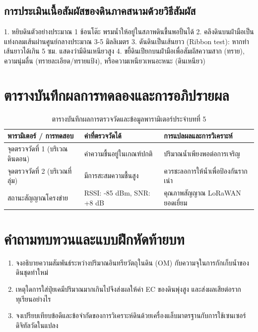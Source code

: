 \subsection{การประเมินเนื้อสัมผัสของดินภาคสนามด้วยวิธีสัมผัส}
\begin{sensorbox}
1. หยิบดินตัวอย่างประมาณ 1 ช้อนโต๊ะ พรมน้ำให้อยู่ในสภาพดินชื้นพอปั้นได้
2. คลึงดินบนฝ่ามือเป็นแท่งกลมเส้นผ่านศูนย์กลางประมาณ 3-5 มิลลิเมตร
3. ดันดินเป็นเส้นยาว (Ribbon test): หากทำเส้นยาวได้เกิน 5 ซม. แสดงว่ามีดินเหนียวสูง
4. ขยี้ดินเปียกบนฝ่ามือเพื่อสัมผัสความสาก (ทราย), ความนุ่มลื่น (ทรายละเอียด/ทรายแป้ง), หรือความเหนียวเหนอะหนะ (ดินเหนียว)
\end{sensorbox}

\section{ตารางบันทึกผลการทดลองและการอภิปรายผล}
\begin{table}[H]
\centering\small
\caption{ตารางบันทึกผลการตรวจวัดและข้อมูลพารามิเตอร์ประจำบทที่ 5}
\label{tab:ch05_datasheet}
\begin{tabularx}{\textwidth}{p{} p{} X}
\toprule
\textbf{พารามิเตอร์ / การทดสอบ} & \textbf{ค่าที่ตรวจวัดได้} & \textbf{การแปลผลและการวิเคราะห์} \\
\midrule
จุดตรวจวัดที่ 1 (บริเวณดินดอน) & ค่าความชื้นอยู่ในเกณฑ์ปกติ & ปริมาณน้ำเพียงพอต่อการเจริญ \\
จุดตรวจวัดที่ 2 (บริเวณที่ลุ่ม) & มีการสะสมความชื้นสูง & ควรชะลอการให้น้ำเพื่อป้องกันรากเน่า \\
สถานะสัญญาณโครงข่าย & RSSI: -85 dBm, SNR: +8 dB & คุณภาพสัญญาณ LoRaWAN ยอดเยี่ยม \\
\bottomrule
\end{tabularx}
\end{table}

\section{คำถามทบทวนและแบบฝึกหัดท้ายบท}
\begin{enumerate}
    \item จงอธิบายความสัมพันธ์ระหว่างปริมาณอินทรียวัตถุในดิน (OM) กับความจุในการกักเก็บน้ำของดินชุดท่าใหม่
    \item เหตุใดการใส่ปุ๋ยเคมีปริมาณมากเกินไปจึงส่งผลให้ค่า EC ของดินพุ่งสูง และส่งผลเสียต่อรากทุเรียนอย่างไร
    \item จงเปรียบเทียบข้อดีและข้อจำกัดของการวิเคราะห์ดินด้วยเครื่องแล็บมาตรฐานกับการใช้เซนเซอร์ดิจิทัลวัดในแปลง
\end{enumerate}
